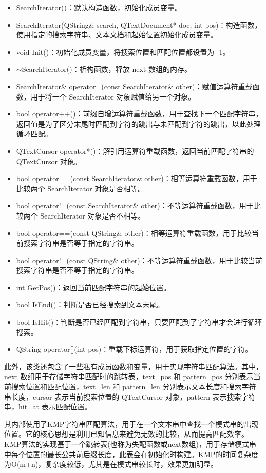 \documentclass{./source/Report}
\begin{document}
\begin{itemize}
    \item SearchIterator()：默认构造函数，初始化成员变量。
    \item SearchIterator(QString\& search, QTextDocument* doc, int pos)：构造函数，使用指定的搜索字符串、文本文档和起始位置初始化成员变量。
    \item void Init()：初始化成员变量，将搜索位置和匹配位置都设置为 -1。
    \item $\sim$SearchIterator()：析构函数，释放 next 数组的内存。
    \item SearchIterator\& operator=(const SearchIterator\& other)：赋值运算符重载函数，用于将一个 SearchIterator 对象赋值给另一个对象。
    \item bool operator++()：前缀自增运算符重载函数，用于查找下一个匹配字符串，返回值是为了区分末尾时匹配到字符的跳出与未匹配到字符的跳出，以此处理循环匹配。
    \item QTextCursor operator*()：解引用运算符重载函数，返回当前匹配字符串的 QTextCursor 对象。
    \item bool operator==(const SearchIterator\& other)：相等运算符重载函数，用于比较两个 SearchIterator 对象是否相等。
    \item bool operator!=(const SearchIterator\& other)：不等运算符重载函数，用于比较两个 SearchIterator 对象是否不相等。
    \item bool operator==(const QString\& other)：相等运算符重载函数，用于比较当前搜索字符串是否等于指定的字符串。
    \item bool operator!=(const QString\& other)：不等运算符重载函数，用于比较当前搜索字符串是否不等于指定的字符串。
    \item int GetPos()：返回当前匹配字符串的起始位置。
    \item bool IsEnd()：判断是否已经搜索到文本末尾。
    \item bool IsHit()：判断是否已经匹配到字符串，只要匹配到了字符串才会进行循环搜索。
    \item QString operator[](int pos)：重载下标运算符，用于获取指定位置的字符。
\end{itemize}
此外，该类还包含了一些私有成员函数和变量，用于实现字符串匹配算法。其中，next 数组用于存储字符串匹配时的跳转表，text\_pos 和 pattern\_pos 分别表示当前搜索位置和匹配位置，text\_len 和 pattern\_len 分别表示文本长度和搜索字符串长度，cursor 表示当前搜索位置的 QTextCursor 对象，pattern 表示搜索字符串，hit\_at 表示匹配位置。

其内部使用了KMP字符串匹配算法，用于在一个文本串中查找一个模式串的出现位置。它的核心思想是利用已知信息来避免无效的比较，从而提高匹配效率。 KMP算法的实现基于一个跳转表(也称为失配函数或next数组)，用于存储模式串中每个位置的最长公共前后缀长度，此表会在初始化时构建。KMP的时间复杂度为O(m+n)，复杂度较低，尤其是在模式串较长时，效果更加明显。
\end{document}
